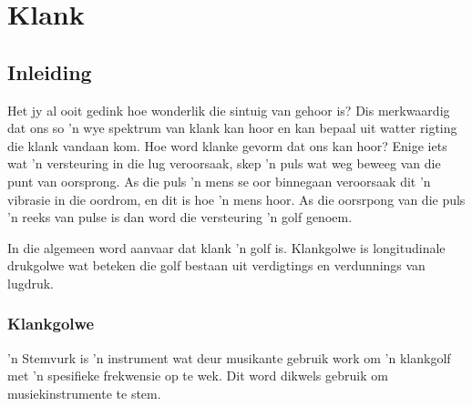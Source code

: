 \chapter{Klank}

    \setcounter{figure}{1}
    \setcounter{subfigure}{1}
    \label{9b5d72dd5f0585e544578ab90a9956a8}
         \section{Inleiding}
    \nopagebreak
    \label{m38799*cid2}
\label{m38799*id183123}Het jy al ooit gedink hoe wonderlik die sintuig van gehoor is? Dis merkwaardig dat ons so 'n wye spektrum van klank kan hoor en kan bepaal uit watter rigting die klank vandaan kom. Hoe word klanke gevorm dat ons kan hoor? Enige iets wat 'n versteuring in die lug veroorsaak, skep 'n puls wat weg beweeg van die punt van oorsprong. As die puls 'n mens se oor binnegaan veroorsaak dit 'n vibrasie in die oordrom, en dit is hoe 'n mens hoor. As die oorsrpong van die puls 'n reeks van pulse is dan word die versteuring 'n golf genoem. \par
{}

In die algemeen word aanvaar dat klank 'n golf is. Klankgolwe is longitudinale drukgolwe wat beteken die golf bestaan uit verdigtings en verdunnings van lugdruk.

\subsection*{Klankgolwe}
            \nopagebreak
 'n Stemvurk is 'n instrument wat deur musikante gebruik work om 'n klankgolf met 'n spesifieke frekwensie op te wek. Dit word dikwels gebruik om musiekinstrumente te stem.

